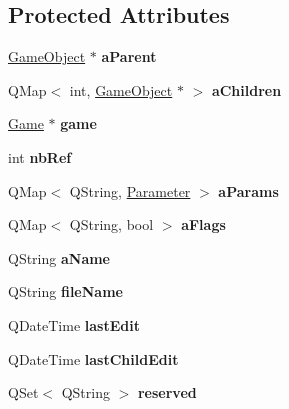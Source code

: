 \subsection*{\-Protected \-Attributes}
\begin{DoxyCompactItemize}
\item 
\hypertarget{class_game_object_a6dc6afadfe70d15d9371d3271d2d7dc6}{\hyperlink{class_game_object}{\-Game\-Object} $\ast$ {\bfseries a\-Parent}}\label{class_game_object_a6dc6afadfe70d15d9371d3271d2d7dc6}

\item 
\hypertarget{class_game_object_ac0f8f486901d9e799b8d171ad26742ad}{\-Q\-Map$<$ int, \hyperlink{class_game_object}{\-Game\-Object} $\ast$ $>$ {\bfseries a\-Children}}\label{class_game_object_ac0f8f486901d9e799b8d171ad26742ad}

\item 
\hypertarget{class_game_object_a338ed91d0ad6aebe8a8d3adf8c75752b}{\hyperlink{class_game}{\-Game} $\ast$ {\bfseries game}}\label{class_game_object_a338ed91d0ad6aebe8a8d3adf8c75752b}

\item 
\hypertarget{class_game_object_a1873810f18db1e1faecc04e0ab92c512}{int {\bfseries nb\-Ref}}\label{class_game_object_a1873810f18db1e1faecc04e0ab92c512}

\item 
\hypertarget{class_game_object_a5fceca16ad7b10dd465a8a13eb155eb6}{\-Q\-Map$<$ \-Q\-String, \hyperlink{class_parameter}{\-Parameter} $>$ {\bfseries a\-Params}}\label{class_game_object_a5fceca16ad7b10dd465a8a13eb155eb6}

\item 
\hypertarget{class_game_object_ade46e4f590a01cab331d12d0da644625}{\-Q\-Map$<$ \-Q\-String, bool $>$ {\bfseries a\-Flags}}\label{class_game_object_ade46e4f590a01cab331d12d0da644625}

\item 
\hypertarget{class_game_object_aad00b615f4d3c6d4d743ff2f8c27a359}{\-Q\-String {\bfseries a\-Name}}\label{class_game_object_aad00b615f4d3c6d4d743ff2f8c27a359}

\item 
\hypertarget{class_game_object_a8e62a0d6755b2930090348622f482f6d}{\-Q\-String {\bfseries file\-Name}}\label{class_game_object_a8e62a0d6755b2930090348622f482f6d}

\item 
\hypertarget{class_game_object_ac1a61f57d5a318b86c4f2bbb4dbde78f}{\-Q\-Date\-Time {\bfseries last\-Edit}}\label{class_game_object_ac1a61f57d5a318b86c4f2bbb4dbde78f}

\item 
\hypertarget{class_game_object_ae0a43c76fc9171015b43d008b5ffcbfd}{\-Q\-Date\-Time {\bfseries last\-Child\-Edit}}\label{class_game_object_ae0a43c76fc9171015b43d008b5ffcbfd}

\item 
\hypertarget{class_game_object_a66ba1ad1dca3c7b2ae424407fce76d66}{\-Q\-Set$<$ \-Q\-String $>$ {\bfseries reserved}}\label{class_game_object_a66ba1ad1dca3c7b2ae424407fce76d66}

\end{DoxyCompactItemize}


